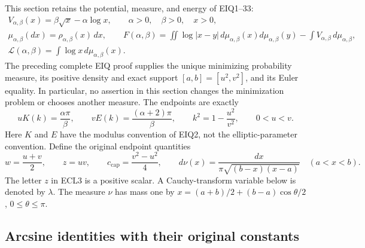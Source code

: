 \documentclass[11pt,a4paper]{article}
\begin{document}
This section retains the potential, measure, and energy of EIQ1--33:
\begin{equation}\tag{ECL1}
\begin{gathered}
V_{\alpha,\beta}(x)=\beta\sqrt{x}-\alpha\log x,\qquad
\alpha>0,\quad\beta>0,\quad x>0,\\
\mu_{\alpha,\beta}(dx)=\rho_{\alpha,\beta}(x)\,dx,\qquad
F(\alpha,\beta)=
\iint\log|x-y|\,d\mu_{\alpha,\beta}(x)d\mu_{\alpha,\beta}(y)
-\int V_{\alpha,\beta}\,d\mu_{\alpha,\beta},\\
\mathcal L(\alpha,\beta)=\int\log x\,d\mu_{\alpha,\beta}(x).
\end{gathered}
\end{equation}
The preceding complete EIQ proof supplies the unique minimizing
probability measure, its positive density and exact support
$[a,b]=[u^2,v^2]$, and its Euler equality. In particular, no assertion
in this section changes the minimization problem or chooses another
measure. The endpoints are exactly
\begin{equation}\tag{ECL2}
uK(k)=\frac{\alpha\pi}{\beta},\qquad
vE(k)=\frac{(\alpha+2)\pi}{\beta},\qquad
k^2=1-\frac{u^2}{v^2},\qquad 0<u<v.
\end{equation}
Here $K$ and $E$ have the modulus convention of EIQ2, not the
elliptic-parameter convention. Define the original endpoint quantities
\begin{equation}\tag{ECL3}
w=\frac{u+v}{2},\qquad z=uv,\qquad
c_{\mathrm{cap}}=\frac{v^2-u^2}{4},\qquad
d\nu(x)=\frac{dx}{\pi\sqrt{(b-x)(x-a)}}\quad(a<x<b).
\end{equation}
The letter $z$ in ECL3 is a positive scalar. A Cauchy-transform variable
below is denoted by $\lambda$. The measure $\nu$ has mass one by
$x=(a+b)/2+(b-a)\cos\theta/2$, $0\leq\theta\leq\pi$.

\subsection{Arcsine identities with their original constants}
\end{document}
